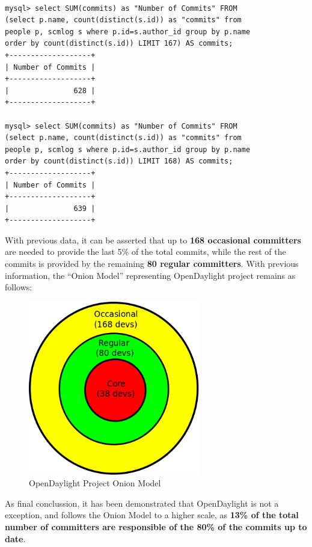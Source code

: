 \documentclass[a4paper, 12pt]{book}
\begin{document}
\begin{verbatim}

mysql> select SUM(commits) as "Number of Commits" FROM
(select p.name, count(distinct(s.id)) as "commits" from
people p, scmlog s where p.id=s.author_id group by p.name
order by count(distinct(s.id)) LIMIT 167) AS commits;
+-------------------+
| Number of Commits |
+-------------------+
|               628 |
+-------------------+

mysql> select SUM(commits) as "Number of Commits" FROM
(select p.name, count(distinct(s.id)) as "commits" from
people p, scmlog s where p.id=s.author_id group by p.name
order by count(distinct(s.id)) LIMIT 168) AS commits;
+-------------------+
| Number of Commits |
+-------------------+
|               639 |
+-------------------+

\end{verbatim}
With previous data, it can be asserted that up to \textbf{168 occasional committers} are needed to provide the last 5\% of the total commits, while the rest of the commits is provided by the remaining \textbf{80 regular committers}. With previous information, the ``Onion Model'' representing OpenDaylight project remains as follows:
\begin{center}
 \begin{figure}[H]
 \begin{center}
   \includegraphics[width=7.5cm]{img/onion01.png}
   \caption{OpenDaylight Project Onion Model}
   \label{fig:odl_onion_model}
 \end{center}
 \end{figure}
\end{center}
As final conclussion, it has been demonstrated that OpenDaylight is not a exception, and follows the Onion Model to a higher scale, as \textbf{13\% of the total number of committers are responsible of the 80\% of the commits up to date}.
\end{document}
